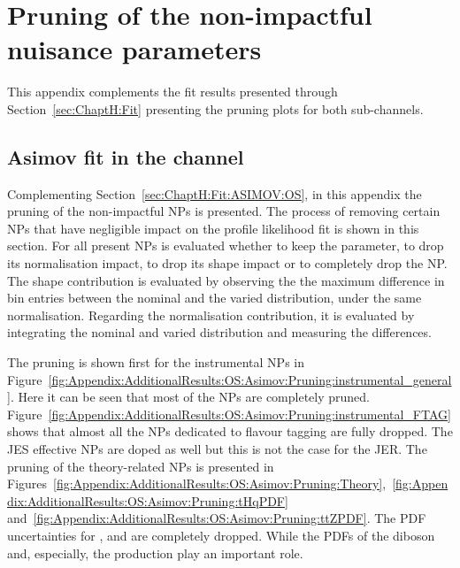 \chapter{Pruning of the non-impactful nuisance parameters}
\label{chap:Appendix:AdditionalResults}
This appendix complements the fit results presented through Section~\ref{sec:ChaptH:Fit}
presenting the pruning plots for both \dileptau sub-channels.


\section{Asimov fit in the \dilepOStau channel}
\label{sec:Appendix:AdditionalResults:OS:Asimov}
Complementing Section~\ref{sec:ChaptH:Fit:ASIMOV:OS}, in this appendix
the pruning of the non-impactful NPs is presented. %
The process of removing certain NPs that have negligible impact on the
 profile likelihood fit is shown in this section. 
For all present NPs is evaluated whether to keep the parameter, to drop
its normalisation impact, to drop its shape impact or to completely drop the
NP. The shape contribution is evaluated by observing the  the maximum difference 
in bin entries between the nominal and the varied distribution, under the same 
normalisation. Regarding the normalisation contribution, it is evaluated by
integrating the nominal and varied distribution and measuring the differences.  

The pruning is shown first for the instrumental NPs in Figure~\ref{fig:Appendix:AdditionalResults:OS:Asimov:Pruning:instrumental_general}.
Here it can be seen that most of the NPs are completely pruned. 
Figure~\ref{fig:Appendix:AdditionalResults:OS:Asimov:Pruning:instrumental_FTAG} shows that  almost 
all the NPs dedicated to flavour tagging are fully dropped. The JES effective NPs are doped as well but this
is not the case for the JER.
The pruning of the theory-related NPs is presented in 
Figures~\ref{fig:Appendix:AdditionalResults:OS:Asimov:Pruning:Theory},~\ref{fig:Appendix:AdditionalResults:OS:Asimov:Pruning:tHqPDF}  and~\ref{fig:Appendix:AdditionalResults:OS:Asimov:Pruning:ttZPDF}. The PDF uncertainties for \ttH, \ttbar and \ttW are completely dropped. While the PDFs of the diboson and, especially, the \tHq production play an important role.


